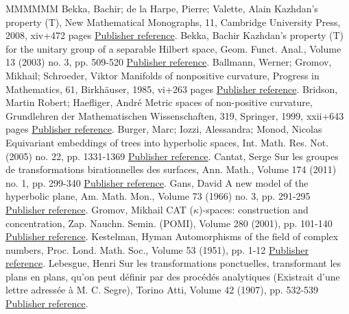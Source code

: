 \documentclass[11pt]{article}
\theoremstyle{definition}
\numberwithin{equation}{section}
\numberwithin{figure}{section}
\numberwithin{table}{section}
\begin{document}
\begin{thebibliography}{MMMMMM}
 Bekka, Bachir; de la Harpe, Pierre; Valette, Alain Kazhdan’s property (T), New Mathematical Monographs, 11, Cambridge University Press, 2008, xiv+472 pages \href{https://ahl.centre-mersenne.org/item/AHL_2019__2__259_0/#Bekka-Harpe-Valette}{Publisher reference}.
 Bekka, Bachir Kazhdan’s property (T) for the unitary group of a separable Hilbert space, Geom. Funct. Anal., Volume 13 (2003) no. 3, pp. 509-520 \href{https://ahl.centre-mersenne.org/item/AHL_2019__2__259_0/#Bekka03}{Publisher reference}.
 Ballmann, Werner; Gromov, Mikhail; Schroeder, Viktor Manifolds of nonpositive curvature, Progress in Mathematics, 61, Birkhäuser, 1985, vi+263 pages \href{https://ahl.centre-mersenne.org/item/AHL_2019__2__259_0/#Ballmann-Gromov-Schroeder}{Publisher reference}.
 Bridson, Martin Robert; Haefliger, André Metric spaces of non-positive curvature, Grundlehren der Mathematischen Wissenschaften, 319, Springer, 1999, xxii+643 pages \href{https://ahl.centre-mersenne.org/item/AHL_2019__2__259_0/#Bridson-Haefliger}{Publisher reference}.
 Burger, Marc; Iozzi, Alessandra; Monod, Nicolas Equivariant embeddings of trees into hyperbolic spaces, Int. Math. Res. Not. (2005) no. 22, pp. 1331-1369 \href{https://ahl.centre-mersenne.org/item/AHL_2019__2__259_0/#Burger-Iozzi-Monod}{Publisher reference}.
 Cantat, Serge Sur les groupes de transformations birationnelles des surfaces, Ann. Math., Volume 174 (2011) no. 1, pp. 299-340 \href{https://ahl.centre-mersenne.org/item/AHL_2019__2__259_0/#Cantat}{Publisher reference}.
 Gans, David A new model of the hyperbolic plane, Am. Math. Mon., Volume 73 (1966) no. 3, pp. 291-295 \href{https://ahl.centre-mersenne.org/item/AHL_2019__2__259_0/#Gans66}{Publisher reference}.
 Gromov, Mikhail  CAT (\(\kappa\))-spaces: construction and concentration, Zap. Nauchn. Semin. (POMI), Volume 280 (2001), pp. 101-140 \href{https://ahl.centre-mersenne.org/item/AHL_2019__2__259_0/#Gromov_conc}{Publisher reference}.
 Kestelman, Hyman Automorphisms of the field of complex numbers, Proc. Lond. Math. Soc., Volume 53 (1951), pp. 1-12 \href{https://ahl.centre-mersenne.org/item/AHL_2019__2__259_0/#Kestelman51}{Publisher reference}.
 Lebesgue, Henri Sur les transformations ponctuelles, transformant les plans en plans, qu’on peut définir par des procédés analytiques (Existrait d’une lettre adressée à M. C. Segre), Torino Atti, Volume 42 (1907), pp. 532-539 \href{https://ahl.centre-mersenne.org/item/AHL_2019__2__259_0/#Lebesgue07}{Publisher reference}.

\end{thebibliography}
\end{document}
